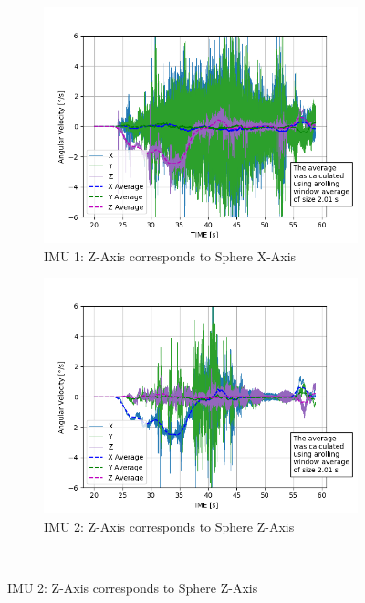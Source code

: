 \documentclass[graybox]{svmono}
\newcommand{\1}{\mathbbm{1}}                 %
\begin{document}
\begin{figure}
\centering
\begin{subfigure}{0.45\textwidth}
\includegraphics[width=\textwidth]{./plotsAndScripts/angVel-2020-01-29-16-14-54/imu1_ang_vel}
\caption{IMU 1: Z-Axis corresponds to Sphere X-Axis}
\label{sec:technicalApproach:fig:imu1_ang_vel}
\end{subfigure}\hfill
\begin{subfigure}{0.45\textwidth}
\includegraphics[width=\textwidth]{./plotsAndScripts/angVel-2020-01-29-16-14-54/imu2_ang_vel}
\caption{IMU 2: Z-Axis corresponds to Sphere Z-Axis}
\label{sec:technicalApproach:fig:imu2_ang_vel}
\end{subfigure}\hfill\\


\end{figure}
\end{document}
